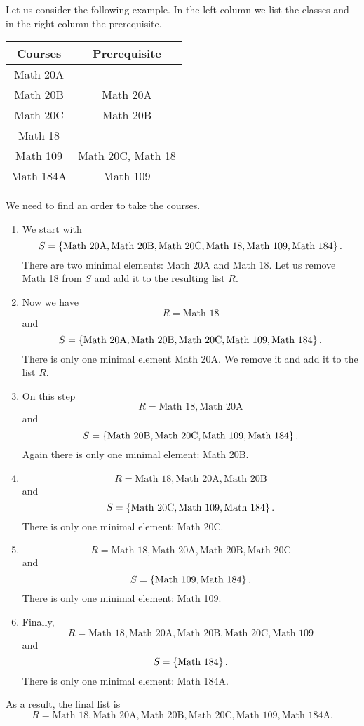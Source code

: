 Let us consider the following example. In the left column we list the classes
and in the right column the prerequisite.
\begin{center}
  \begin{tabular}{c | c}
    Courses & Prerequisite \\
    \hline
    Math 20A \\
    Math 20B & Math 20A \\
    Math 20C & Math 20B \\
    Math 18 \\
    Math 109 & Math 20C, Math 18 \\
    Math 184A & Math 109
  \end{tabular}
\end{center}
We need to find an order to take the courses.
\begin{enumerate}
  \item We start with
    \[
      S = \set{\text{Math 20A}, \text{Math 20B},
        \text{Math 20C}, \text{Math 18}, \text{Math 109}, \text{Math 184}}.
    \]
    There are two minimal elements: Math 20A and Math 18. Let us remove Math 18
    from $S$ and add it to the resulting list $R$.
  \item Now we have
    \[
      R = \text{Math 18}
    \]
    and
    \[
      S = \set{\text{Math 20A},
      \text{Math 20B}, \text{Math 20C}, \text{Math 109}, \text{Math 184}}.
    \]
    There is only one minimal element Math 20A. We remove it and add it to the
    list $R$.
  \item On this step
    \[
      R = \text{Math 18}, \text{Math 20A}
    \]
    and
    \[
      S = \set{
        \text{Math 20B}, \text{Math 20C}, \text{Math 109}, \text{Math 184}}.
    \]
    Again there is only one minimal element: Math 20B.
  \item
    \[
      R = \text{Math 18}, \text{Math 20A}, \text{Math 20B}
    \] and
    \[
      S = \set{\text{Math 20C}, \text{Math 109}, \text{Math 184}}.
    \]
    There is only one minimal element: Math 20C.
  \item
    \[
      R = \text{Math 18}, \text{Math 20A}, \text{Math 20B}, \text{Math 20C}
    \]
    and
    \[
      S = \set{\text{Math 109}, \text{Math 184}}.
    \]
    There is only one minimal element: Math 109.
  \item Finally,
    \[
      R = \text{Math 18}, \text{Math 20A}, \text{Math 20B}, \text{Math 20C},
      \text{Math 109}
    \]
    and
    \[
      S = \set{\text{Math 184}}.
    \]
    There is only one minimal element: Math 184A.
\end{enumerate}
As a result, the final list is
\[
  R = \text{Math 18}, \text{Math 20A}, \text{Math 20B}, \text{Math 20C},
  \text{Math 109}, \text{Math 184A}.
\]

